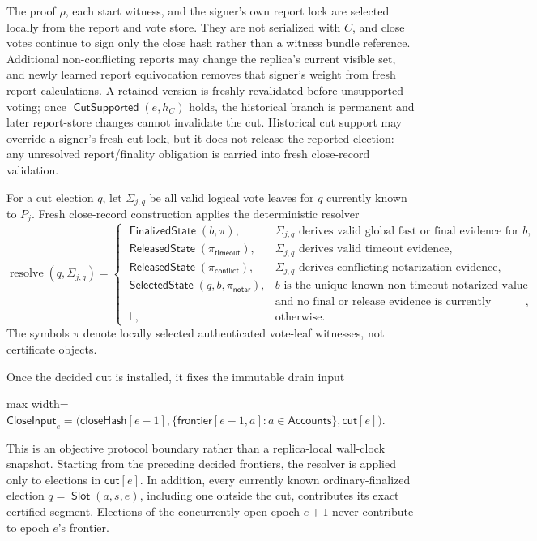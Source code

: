 \documentclass[sigplan,twocolumn,review,anonymous]{acmart}
\newcommand{\func}[1]{\operatorname{\mathsf{#1}}}
\newcommand{\Slot}{\func{Slot}}
\newcommand{\frontier}{\mathsf{frontier}}
\newcommand{\closeHash}{\mathsf{closeHash}}
\newcommand{\closeCut}{\mathsf{cut}}
\newcommand{\SelectedState}{\func{SelectedState}}
\newcommand{\FinalizedState}{\func{FinalizedState}}
\newcommand{\ReleasedState}{\func{ReleasedState}}
\begin{document}
The proof \(\rho\), each start witness, and the signer's own report lock are selected locally from the
report and vote store.  They are not serialized with \(C\), and close votes continue to sign only the
close hash rather than a witness bundle reference.  Additional non-conflicting reports may change the
replica's current visible set, and newly learned report equivocation removes that signer's weight from
fresh report calculations.  A retained version is freshly revalidated before unsupported voting; once
\(\func{CutSupported}(e,h_C)\) holds, the historical branch is permanent and later report-store changes
cannot invalidate the cut.  Historical cut support may override a signer's fresh cut lock, but it does
not release the reported election: any unresolved report/finality obligation is carried into fresh
close-record validation.

For a cut election \(q\), let \(\Sigma_{j,q}\) be all valid logical vote leaves for \(q\) currently known to
\(P_j\).  Fresh close-record construction applies the deterministic resolver
\[
\operatorname{resolve}(q,\Sigma_{j,q})=
\begin{cases}
\FinalizedState(b,\pi),
  & \Sigma_{j,q}\text{ derives valid global fast or final evidence for }b,\\
\ReleasedState(\pi_{\mathsf{timeout}}),
  & \Sigma_{j,q}\text{ derives valid timeout evidence},\\
\ReleasedState(\pi_{\mathsf{conflict}}),
  & \Sigma_{j,q}\text{ derives conflicting notarization evidence},\\
\SelectedState(q,b,\pi_{\mathsf{notar}}),
  & b\text{ is the unique known non-timeout notarized value}\\
  & \text{and no final or release evidence is currently known},\\
\bot, & \text{otherwise.}
\end{cases}
\]
The symbols \(\pi\) denote locally selected authenticated vote-leaf witnesses, not certificate objects.

Once the decided cut is installed, it fixes the immutable drain input
\begin{center}
\begin{adjustbox}{max width=\columnwidth}
\(\displaystyle
\mathsf{CloseInput}_e=
\bigl(\closeHash[e-1],\{\frontier[e-1,a]:a\in\mathsf{Accounts}\},\closeCut[e]\bigr).
\)
\end{adjustbox}
\end{center}
This is an objective protocol boundary rather than a replica-local wall-clock snapshot.  Starting from
the preceding decided frontiers, the resolver is applied only to elections in \(\closeCut[e]\).  In
addition, every currently known ordinary-finalized election \(q=\Slot(a,s,e)\), including one outside
the cut, contributes its exact certified segment.  Elections of the concurrently open epoch \(e+1\)
never contribute to epoch \(e\)'s frontier.
\end{document}
